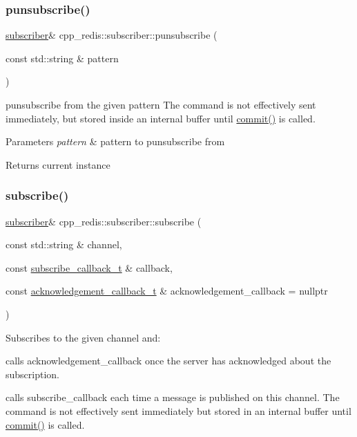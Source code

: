 \subsubsection{\texorpdfstring{punsubscribe()}{punsubscribe()}}
{\footnotesize\ttfamily \hyperlink{classcpp__redis_1_1subscriber}{subscriber}\& cpp\+\_\+redis\+::subscriber\+::punsubscribe (\begin{DoxyParamCaption}\item[{const std\+::string \&}]{pattern }\end{DoxyParamCaption})}

punsubscribe from the given pattern The command is not effectively sent immediately, but stored inside an internal buffer until \hyperlink{classcpp__redis_1_1subscriber_abbf600802ed93b82323185eec5719ecb}{commit()} is called.


\begin{DoxyParams}{Parameters}
{\em pattern} & pattern to punsubscribe from \\
\hline
\end{DoxyParams}
\begin{DoxyReturn}{Returns}
current instance 
\end{DoxyReturn}
\mbox{\label{classcpp__redis_1_1subscriber_afee579c702182041645a3d3c55de4b9e}} 
\subsubsection{\texorpdfstring{subscribe()}{subscribe()}}
{\footnotesize\ttfamily \hyperlink{classcpp__redis_1_1subscriber}{subscriber}\& cpp\+\_\+redis\+::subscriber\+::subscribe (\begin{DoxyParamCaption}\item[{const std\+::string \&}]{channel,  }\item[{const \hyperlink{classcpp__redis_1_1subscriber_ac6ab8ebc526d784e4b79a39bbd73dca8}{subscribe\+\_\+callback\+\_\+t} \&}]{callback,  }\item[{const \hyperlink{classcpp__redis_1_1subscriber_a19ea39dfabeb19937a9ce4c8d21781b4}{acknowledgement\+\_\+callback\+\_\+t} \&}]{acknowledgement\+\_\+callback = {\ttfamily nullptr} }\end{DoxyParamCaption})}

Subscribes to the given channel and\+:
\begin{DoxyItemize}
\item calls acknowledgement\+\_\+callback once the server has acknowledged about the subscription.
\item calls subscribe\+\_\+callback each time a message is published on this channel. The command is not effectively sent immediately but stored in an internal buffer until \hyperlink{classcpp__redis_1_1subscriber_abbf600802ed93b82323185eec5719ecb}{commit()} is called.
\end{DoxyItemize}


